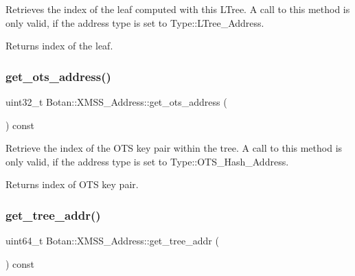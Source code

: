 Retrieves the index of the leaf computed with this L\+Tree. A call to this method is only valid, if the address type is set to Type\+::\+L\+Tree\+\_\+\+Address.

\begin{DoxyReturn}{Returns}
index of the leaf. 
\end{DoxyReturn}
\mbox{\label{class_botan_1_1_x_m_s_s___address_a51d64c847fb1ba38a29c24da4b590c83}} 
\subsubsection{\texorpdfstring{get\+\_\+ots\+\_\+address()}{get\_ots\_address()}}
{\footnotesize\ttfamily uint32\+\_\+t Botan\+::\+X\+M\+S\+S\+\_\+\+Address\+::get\+\_\+ots\+\_\+address (\begin{DoxyParamCaption}{ }\end{DoxyParamCaption}) const\hspace{0.3cm}{\ttfamily [inline]}}

Retrieve the index of the O\+TS key pair within the tree. A call to this method is only valid, if the address type is set to Type\+::\+O\+T\+S\+\_\+\+Hash\+\_\+\+Address.

\begin{DoxyReturn}{Returns}
index of O\+TS key pair. 
\end{DoxyReturn}
\mbox{\label{class_botan_1_1_x_m_s_s___address_ac6ffefc09f01cd25f9acb76f6fcd4071}} 
\subsubsection{\texorpdfstring{get\+\_\+tree\+\_\+addr()}{get\_tree\_addr()}}
{\footnotesize\ttfamily uint64\+\_\+t Botan\+::\+X\+M\+S\+S\+\_\+\+Address\+::get\+\_\+tree\+\_\+addr (\begin{DoxyParamCaption}{ }\end{DoxyParamCaption}) const\hspace{0.3cm}{\ttfamily [inline]}}

